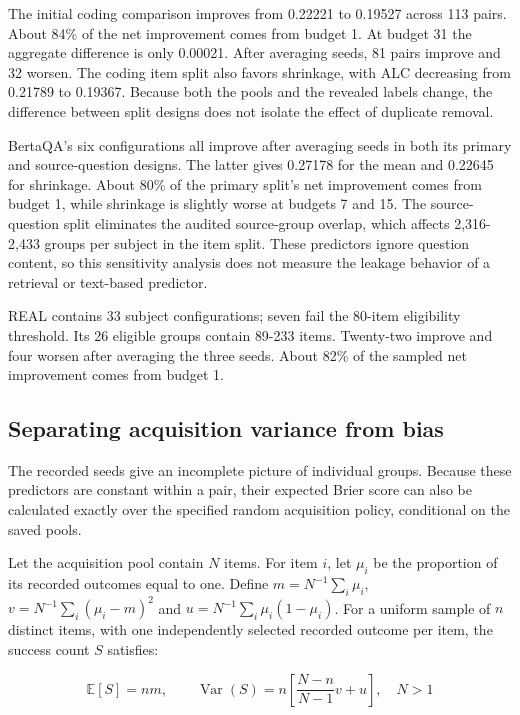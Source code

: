 \documentclass{article}
\begin{document}
The initial coding comparison improves from 0.22221 to 0.19527 across 113 pairs. About 84\% of the net improvement comes from budget 1. At budget 31 the aggregate difference is only 0.00021. After averaging seeds, 81 pairs improve and 32 worsen. The coding item split also favors shrinkage, with ALC decreasing from 0.21789 to 0.19367. Because both the pools and the revealed labels change, the difference between split designs does not isolate the effect of duplicate removal.

BertaQA's six configurations all improve after averaging seeds in both its primary and source-question designs. The latter gives 0.27178 for the mean and 0.22645 for shrinkage. About 80\% of the primary split's net improvement comes from budget 1, while shrinkage is slightly worse at budgets 7 and 15. The source-question split eliminates the audited source-group overlap, which affects 2,316-2,433 groups per subject in the item split. These predictors ignore question content, so this sensitivity analysis does not measure the leakage behavior of a retrieval or text-based predictor.

REAL contains 33 subject configurations; seven fail the 80-item eligibility threshold. Its 26 eligible groups contain 89-233 items. Twenty-two improve and four worsen after averaging the three seeds. About 82\% of the sampled net improvement comes from budget 1.

\subsection{Separating acquisition variance from bias}\label{separating-acquisition-variance-from-bias}

The recorded seeds give an incomplete picture of individual groups. Because these predictors are constant within a pair, their expected Brier score can also be calculated exactly over the specified random acquisition policy, conditional on the saved pools.

Let the acquisition pool contain \(N\) items. For item \(i\), let \(\mu_i\) be the proportion of its recorded outcomes equal to one. Define \(m=N^{-1}\sum_i\mu_i\), \(v=N^{-1}\sum_i(\mu_i-m)^2\) and \(u=N^{-1}\sum_i\mu_i(1-\mu_i)\). For a uniform sample of \(n\) distinct items, with one independently selected recorded outcome per item, the success count \(S\) satisfies:

\begin{equation}
\mathbb{E}[S]=n m,\qquad\operatorname{Var}(S)=n\left[\frac{N-n}{N-1}v+u\right],\quad N>1
\end{equation}
\end{document}
